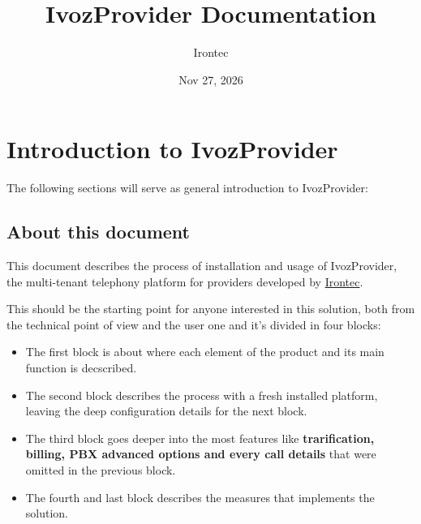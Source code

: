 \documentclass[letterpaper,10pt,english]{sphinxmanual}
\title{IvozProvider Documentation}
\date{Nov 27, 2026}
\author{Irontec}
\begin{document}
\maketitle
\tableofcontents
{}\label{index::doc}



\chapter{Introduction to IvozProvider}
\label{intro/index::doc}\label{intro/index:introduction-to-ivozprovider}\label{intro/index:ivozprovider-official-documentation}
The following sections will serve as general introduction to IvozProvider:


\section{About this document}
\label{intro/about:about-this-document}\label{intro/about::doc}
This document describes the process of installation and usage of
IvozProvider, the multi-tenant telephony platform for providers developed
by \href{http://irontec.com}{Irontec}.

This should be the starting point for anyone interested in this solution,
both  from the technical point of view and the user one and it's divided
in four blocks:
\begin{itemize}
\item {} 
The first block is about {\hyperref[index:concepts]{}} where each element of the
product and its main function is decscribed.

\item {} 
The second block describes the {\hyperref[index:installation]{}} process with a fresh
installed platform, leaving the deep configuration details for the next
block.

\item {} 
The third block goes deeper into the most {\hyperref[index:advanced]{}} features like
\textbf{trarification, billing, PBX advanced options and every call details}
that were omitted in the previous block.

\item {} 
The fourth and last block describes the {\hyperref[index:security]{}} measures that
implements the solution.

\end{itemize}
\end{document}

